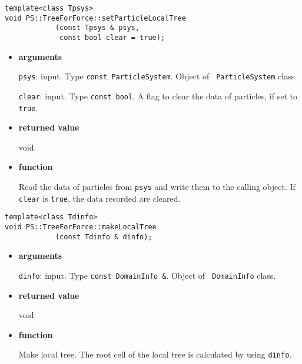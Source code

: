 
\begin{screen}
\begin{verbatim}
template<class Tpsys>
void PS::TreeForForce::setParticleLocalTree
            (const Tpsys & psys,
             const bool clear = true);
\end{verbatim}
\end{screen}

\begin{itemize}

\item {\bf arguments}

{\tt psys}: input. Type {\tt const ParticleSystem}. Object of {\tt
ParticleSystem} class

{\tt clear}: input. Type {\tt const bool}. A flag to clear the data of
particles, if set to {\tt true}.

\item {\bf returned value}

void.

\item {\bf function}

Read the data of particles from {\tt psys} and write them to the
calling object.  If {\tt clear} is {\tt true}, the data recorded are
cleared.

\end{itemize}


\begin{screen}
\begin{verbatim}
template<class Tdinfo>
void PS::TreeForForce::makeLocalTree
            (const Tdinfo & dinfo);
\end{verbatim}
\end{screen}

\begin{itemize}

\item {\bf arguments}

{\tt dinfo}: input. Type {\tt const DomainInfo \&}. Object of {\tt
DomainInfo} class.

\item {\bf returned value}

void.

\item {\bf function}

Make local tree. The root cell of the local tree is calculated by
using {\tt dinfo}.

\end{itemize}

